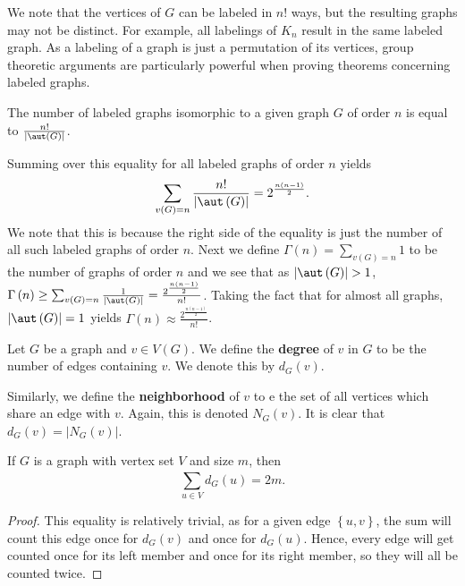 \begin{remark}
	We note that the vertices of $G$ can be labeled in $n!$ ways, but the resulting graphs may not be distinct. For example, all labelings of $K_{n}$ result in the same labeled graph. As a labeling of a graph is just a permutation of its vertices, group theoretic arguments are particularly powerful when proving theorems concerning labeled graphs.
\end{remark}
\begin{proposition}
	The number of labeled graphs isomorphic to a given graph $G$ of order $n$ is equal to $\frac{n!}{\left| \aut \left( G \right)  \right| }$.
\end{proposition}
Summing over this equality for all labeled graphs of order $n$ yields \[
	\sum_{v\left( G \right) = n}^{} \frac{n!}{\left| \aut \left( G \right)  \right| } = 2 ^{\frac{n\left( n-1 \right) }{2}}
.\]
We note that this is because the right side of the equality is just the number of all such labeled graphs of order $n$. Next we define $\Gamma \left( n \right) = \sum_{v\left( G \right) = n}^{} 1$ to be the number of graphs of order $n$ and we see that as $\left| \aut \left( G \right)  \right| > 1$, $\Gamma \left( n \right)  \ge \sum_{ v\left( G \right) = n}^{} \frac{1}{\left| \aut \left( G \right)  \right| } = \frac{2^{\frac{n\left( n-1 \right) }{2}}}{n!}$. Taking the fact that for almost all graphs, $\left| \aut \left( G \right)  \right| = 1$ yields  $\Gamma \left( n \right) \approx \frac{2^{\frac{n\left( n-1 \right) }{2}}}{n!}$.
\begin{definition}[Degree]
	Let  $G$ be a graph and $v \in V\left( G \right) $. We define the \textbf{degree} of $v$ in $G$ to be the number of edges containing $v$. We denote this by $d_{G}\left( v \right) $.
\end{definition}
\begin{definition}[Neighborhood]
	Similarly, we define the \textbf{neighborhood} of $v$ to e the set of all vertices which share an edge with $v$. Again, this is denoted $N_{G}\left( v \right) $. It is clear that $d_{G}\left( v \right) = \left| N_{G}\left( v \right)  \right| $.
\end{definition}
 \begin{proposition}
	If $G$ is a graph with vertex set $V$ and size $m$, then \[
		\sum_{u \in V}^{} d_{G}\left( u \right)  = 2m
	.\]
\end{proposition}
\begin{proof}
	This equality is relatively trivial, as for a given edge $\left\{ u,v \right\} $, the sum will count this edge once for $d_{G}\left( v \right) $ and once for $d_{G}\left( u \right) $. Hence, every edge will get counted once for its left member and once for its right member, so they will all be counted twice.
\end{proof}

